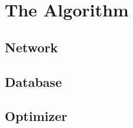 \section{The Algorithm}


\newpage

\subsection{Network} \label{sec:NN}

\newpage

\subsection{Database} \label{sec:DB}

\newpage

\subsection{Optimizer} \label{sec:opt}

